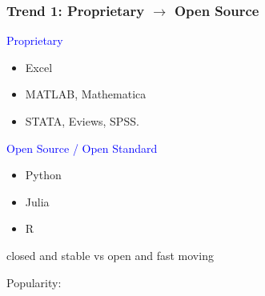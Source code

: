 \documentclass[
    xcolor={svgnames,dvipsnames},
    hyperref={colorlinks, citecolor=DeepPink4, linkcolor=DarkRed, urlcolor=DarkBlue}
    ]{beamer}  %
\newcommand{\blue}[1]{\textcolor{Blue}{\sf #1}}
\newcommand{\1}{\mathbbm 1}
\begin{document}
\begin{frame}
    \frametitle{Trend 1: Proprietary $\to$ Open Source}
    
    \blue{Proprietary} 
    \begin{itemize}
        \item Excel
        \item MATLAB, Mathematica
        \item STATA, Eviews, SPSS.
    \end{itemize}
    

    \vspace{0.5em}
    \vspace{0.5em}
    \blue{Open Source / Open Standard} 
    
    \begin{itemize}
        \item Python
        \item Julia
        \item R
    \end{itemize}


    \begin{center}
        closed and stable vs open and fast moving
    \end{center}

\end{frame}

\begin{frame}

    Popularity:

    \begin{figure}
       \begin{center}
       \end{center}
    \end{figure}

\end{frame}
\end{document}
